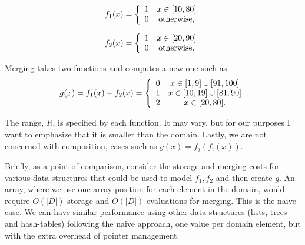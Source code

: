 \documentclass{article}
\begin{document}
\begin{minipage}{.5\linewidth}
\begin{displaymath}
  f_{1}(x) = \left\{
        \begin{array}{c c}
          1 & x \in [10,80] \\
          0 & \text{otherwise,} \\ %
        \end{array}
     \right.
\end{displaymath}
\end{minipage}%
\begin{minipage}{.5\linewidth}
\begin{displaymath}
  f_{2}(x) = \left\{
        \begin{array}{c c}
          1 & x \in [20,90] \\
          0 & \text{otherwise.} \\ %
        \end{array}
     \right.
\end{displaymath}
\end{minipage}
Merging takes two functions and computes a new
one
such as
\begin{displaymath}
  g(x) = f_{1}(x)+f_{2}(x) = \left\{
        \begin{array}{c c}
          0 & x \in [1,9] \cup [91,100] \\
          1 & x \in [10,19] \cup [81,90] \\
          2 & x \in [20,80]. \\
        \end{array}
     \right.
\end{displaymath}

The range, $R$, is specified by each function.
It may vary, but for our purposes I want to emphasize that it is smaller
than the domain.
Lastly,
we are not concerned with composition,
cases such as $g(x)=f_{j}(f_{i}(x))$.

Briefly, as a point of comparison,
consider the storage and merging costs for various data
structures that could be used to model $f_{1}, f_{2}$ and then create $g$.
An array, where we use one array position for each element in the domain,
would require $O(|D|)$ storage and $O(|D|)$ evaluations for merging.
This is the naive case.
We can have similar performance using other data-structures
(lists, trees and hash-tables) following the naive approach,
one value per domain element,
but with the extra overhead of pointer management.
\end{document}

